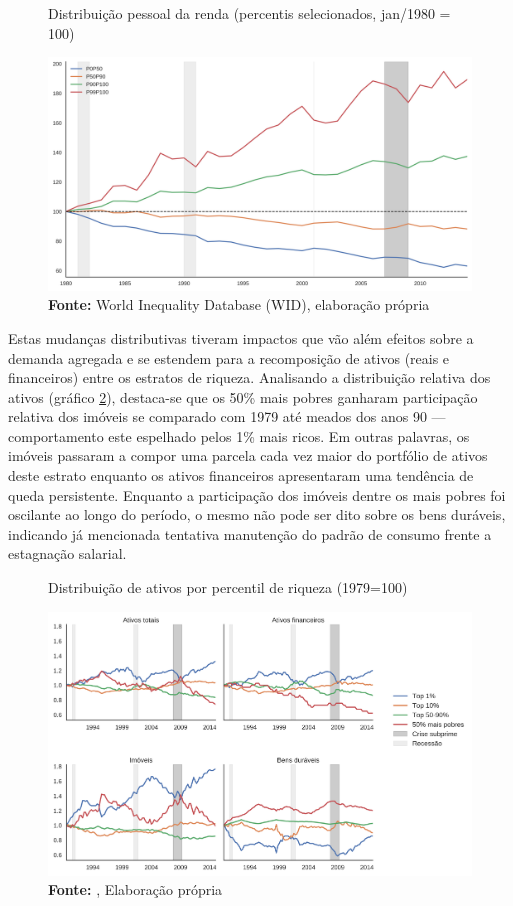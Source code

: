 \begin{figure}[H]
	\centering
	\caption{Distribuição pessoal da renda (percentis selecionados, jan/1980 = 100)}
	\label{FigDistPessoal}
	\includegraphics[width=\textwidth]{../../Dados/Fatos_Estilizados/figs/Dist_Pessoal.png}
	\caption*{\textbf{Fonte:} World Inequality Database (WID), elaboração própria}
\end{figure}


Estas mudanças distributivas tiveram impactos que vão além efeitos sobre a demanda agregada e se estendem para a recomposição de ativos (reais e financeiros) entre os estratos de riqueza.
Analisando a distribuição relativa dos ativos (gráfico \ref{FigDistAtivos}), destaca-se que os 50\% mais pobres ganharam participação relativa dos imóveis se comparado com 1979 até meados dos anos 90 ---  comportamento este espelhado pelos 1\% mais ricos. 
Em outras palavras, os imóveis passaram a compor uma parcela cada vez maior do portfólio de ativos deste estrato enquanto os ativos financeiros apresentaram uma tendência de queda persistente.
Enquanto a participação dos imóveis dentre os mais pobres foi oscilante ao longo do período, o mesmo não pode ser dito sobre os bens duráveis, indicando já mencionada tentativa manutenção do padrão de consumo frente a estagnação salarial.


\begin{figure}[H]
	\centering
	\caption{Distribuição de ativos por percentil de riqueza (1979=100)}
	\label{FigDistAtivos}
	\includegraphics[width=\textwidth]{../../Dados/Fatos_Estilizados/figs/Distribuicao_Ativos.png}
	\caption*{\textbf{Fonte:} \textcite{us_census_bureau_characteristics_2017}, Elaboração própria}
\end{figure}

